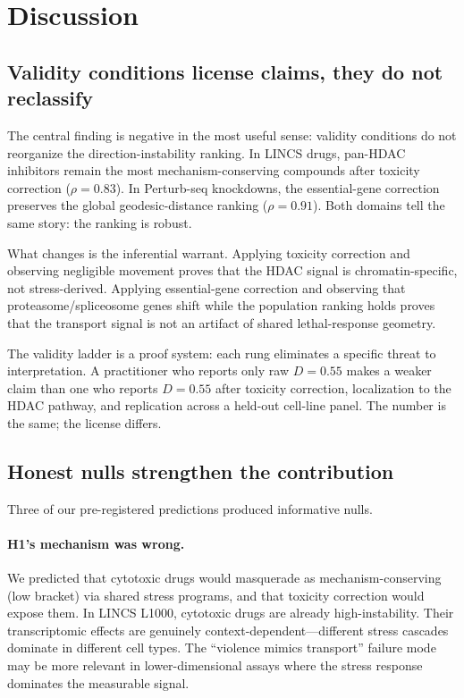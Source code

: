 \documentclass{article}
\begin{document}
\section{Discussion}

\subsection{Validity conditions license claims, they do not reclassify}

The central finding is negative in the most useful sense: validity conditions
do not reorganize the direction-instability ranking. In LINCS drugs, pan-HDAC
inhibitors remain the most mechanism-conserving compounds after toxicity
correction ($\rho = 0.83$). In Perturb-seq knockdowns, the essential-gene
correction preserves the global geodesic-distance ranking ($\rho = 0.91$).
Both domains tell the same story: the ranking is robust.

What changes is the inferential warrant. Applying toxicity correction and
observing negligible movement proves that the HDAC signal is
chromatin-specific, not stress-derived. Applying essential-gene correction
and observing that proteasome/spliceosome genes shift while the population
ranking holds proves that the transport signal is not an artifact of shared
lethal-response geometry.

The validity ladder is a proof system: each rung eliminates a specific threat
to interpretation. A practitioner who reports only raw $D = 0.55$ makes a
weaker claim than one who reports $D = 0.55$ after toxicity correction,
localization to the HDAC pathway, and replication across a held-out cell-line
panel. The number is the same; the license differs.

\subsection{Honest nulls strengthen the contribution}

Three of our pre-registered predictions produced informative nulls.

\paragraph{H1's mechanism was wrong.}
We predicted that cytotoxic drugs would masquerade as mechanism-conserving
(low bracket) via shared stress programs, and that toxicity correction would
expose them. In LINCS L1000, cytotoxic drugs are already high-instability.
Their transcriptomic effects are genuinely context-dependent---different stress
cascades dominate in different cell types. The ``violence mimics transport''
failure mode may be more relevant in lower-dimensional assays where the stress
response dominates the measurable signal.
\end{document}
